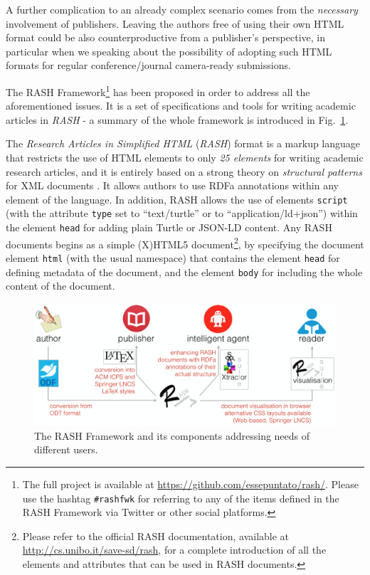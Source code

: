 \documentclass[runningheads,a4paper]{llncs}
\makeatletter
\def\maxwidth#1{\ifdim\Gin@nat@width>#1 #1\else\Gin@nat@width\fi}
\makeatother
\begin{document}
A further complication to an already complex scenario comes from the {\em necessary} involvement of publishers. Leaving the authors free of using their own HTML format could be also counterproductive from a publisher's perspective, in particular when we speaking about the possibility of adopting such HTML formats for regular conference/journal camera-ready submissions.

The RASH Framework\footnote{The full project is available at \url{https://github.com/essepuntato/rash/}. Please use the hashtag \verb+#rashfwk+ for referring to any of the items defined in the RASH Framework via Twitter or other social platforms.} has been proposed in order to address all the aforementioned issues. It is a set of specifications and tools for writing academic articles in {\em RASH} - a summary of the whole framework is introduced in Fig.~\ref{fig_framework}.

The {\em Research Articles in Simplified HTML} ({\em RASH}) format is a markup language that restricts the use of HTML elements to only {\em 25 elements} for writing academic research articles, and it is entirely based on a strong theory on {\em structural patterns} for XML documents  \cite{patterns}. It allows authors to use RDFa annotations within any element of the language. In addition, RASH allows the use of elements \verb+script+ (with the attribute \verb+type+ set to ``text/turtle'' or to ``application/ld+json'') within the element \verb+head+ for adding plain Turtle or JSON-LD content. Any RASH documents begins as a simple (X)HTML5 document\footnote{Please refer to the official RASH documentation, available at \url{http://cs.unibo.it/save-sd/rash}, for a complete introduction of all the elements and attributes that can be used in RASH documents.}, by specifying the document element \verb+html+ (with the usual namespace) that contains the element \verb+head+ for defining metadata of the document, and the element \verb+body+ for including the whole content of the document.
\begin{figure}[h!]
\centering
\includegraphics[width=\maxwidth{\textwidth}]{img/rash-demo-iswc2015-framework.png}
\caption{The RASH Framework and its components addressing needs of different users.}
\label{fig_framework}
\end{figure}
\end{document}
